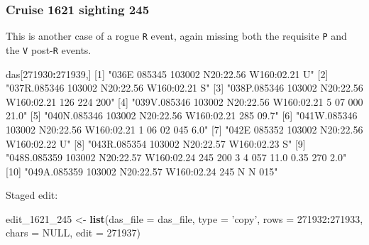 \documentclass[
]{book}
\newenvironment{Shaded}{\begin{snugshade}}{\end{snugshade}}
\newcommand{\DataTypeTok}[1]{\textcolor[rgb]{0.13,0.29,0.53}{#1}}
\newcommand{\DecValTok}[1]{\textcolor[rgb]{0.00,0.00,0.81}{#1}}
\newcommand{\KeywordTok}[1]{\textcolor[rgb]{0.13,0.29,0.53}{\textbf{#1}}}
\newcommand{\NormalTok}[1]{#1}
\newcommand{\OperatorTok}[1]{\textcolor[rgb]{0.81,0.36,0.00}{\textbf{#1}}}
\newcommand{\OtherTok}[1]{\textcolor[rgb]{0.56,0.35,0.01}{#1}}
\newcommand{\StringTok}[1]{\textcolor[rgb]{0.31,0.60,0.02}{#1}}
\begin{document}
\hypertarget{cruise-1621-sighting-245}{%
\subsubsection*{Cruise 1621 sighting 245}\label{cruise-1621-sighting-245}}

This is another case of a rogue \texttt{R} event, again missing both the requisite \texttt{P} and the \texttt{V} post-\texttt{R} events.

\begin{Shaded}
\begin{Highlighting}[]
\NormalTok{das[}\DecValTok{271930}\OperatorTok{:}\DecValTok{271939}\NormalTok{,] }
\NormalTok{ [}\DecValTok{1}\NormalTok{] }\StringTok{"036E 085345 103002 N20:22.56 W160:02.21    U"}                                        
\NormalTok{ [}\DecValTok{2}\NormalTok{] }\StringTok{"037R.085346 103002 N20:22.56 W160:02.21    S"}                                        
\NormalTok{ [}\DecValTok{3}\NormalTok{] }\StringTok{"038P.085346 103002 N20:22.56 W160:02.21  126  224  200"}                              
\NormalTok{ [}\DecValTok{4}\NormalTok{] }\StringTok{"039V.085346 103002 N20:22.56 W160:02.21    5   07  000      21.0"}                    
\NormalTok{ [}\DecValTok{5}\NormalTok{] }\StringTok{"040N.085346 103002 N20:22.56 W160:02.21  285 09.7"}                                   
\NormalTok{ [}\DecValTok{6}\NormalTok{] }\StringTok{"041W.085346 103002 N20:22.56 W160:02.21    1   06   02  045  6.0"}                    
\NormalTok{ [}\DecValTok{7}\NormalTok{] }\StringTok{"042E 085352 103002 N20:22.56 W160:02.22    U"}                                        
\NormalTok{ [}\DecValTok{8}\NormalTok{] }\StringTok{"043R.085354 103002 N20:22.57 W160:02.23    S"}                                        
\NormalTok{ [}\DecValTok{9}\NormalTok{] }\StringTok{"048S.085359 103002 N20:22.57 W160:02.24  245  200    3    4  057 11.0 0.35  270  2.0"}
\NormalTok{[}\DecValTok{10}\NormalTok{] }\StringTok{"049A.085359 103002 N20:22.57 W160:02.24  245         N    N  015"}                    
\end{Highlighting}
\end{Shaded}

Staged edit:

\begin{Shaded}
\begin{Highlighting}[]
\NormalTok{edit_}\DecValTok{1621}\NormalTok{_}\DecValTok{245}\NormalTok{ <-}\StringTok{ }
\StringTok{  }\KeywordTok{list}\NormalTok{(}\DataTypeTok{das_file =}\NormalTok{ das_file, }
       \DataTypeTok{type =} \StringTok{'copy'}\NormalTok{,}
       \DataTypeTok{rows =} \DecValTok{271932}\OperatorTok{:}\DecValTok{271933}\NormalTok{,}
       \DataTypeTok{chars =} \OtherTok{NULL}\NormalTok{,}
       \DataTypeTok{edit =} \DecValTok{271937}\NormalTok{)}
\end{Highlighting}
\end{Shaded}
\end{document}
